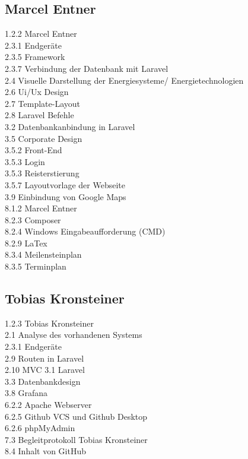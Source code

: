 \subsection{Marcel Entner}
1.2.2 Marcel Entner \\
2.3.1 Endgeräte \\ 
2.3.5 Framework \\
2.3.7 Verbindung der Datenbank mit Laravel \\
2.4 Visuelle Darstellung der Energiesysteme/ Energietechnologien  \\
2.6 Ui/Ux Design  \\
2.7 Template-Layout  \\
2.8 Laravel Befehle \\
3.2 Datenbankanbindung in Laravel \\
3.5 Corporate Design \\
3.5.2 Front-End \\
3.5.3 Login \\
3.5.3 Reisterstierung \\
3.5.7 Layoutvorlage der Webseite \\
3.9 Einbindung von Google Maps \\
8.1.2 Marcel Entner \\
8.2.3 Composer \\
8.2.4 Windows Eingabeaufforderung (CMD) \\
8.2.9 LaTex  \\
8.3.4 Meilensteinplan \\
8.3.5 Terminplan \\


\subsection{Tobias Kronsteiner}
1.2.3 Tobias Kronsteiner\\
2.1 Analyse des vorhandenen Systems\\
2.3.1 Endgeräte\\
2.9 Routen in Laravel\\
2.10 MVC
3.1 Laravel\\
3.3 Datenbankdesign\\
3.8 Grafana\\
6.2.2 Apache Webserver\\
6.2.5 Github VCS und Github Desktop\\
6.2.6 phpMyAdmin\\
7.3 Begleitprotokoll Tobias Kronsteiner\\
8.4 Inhalt von GitHub\\

